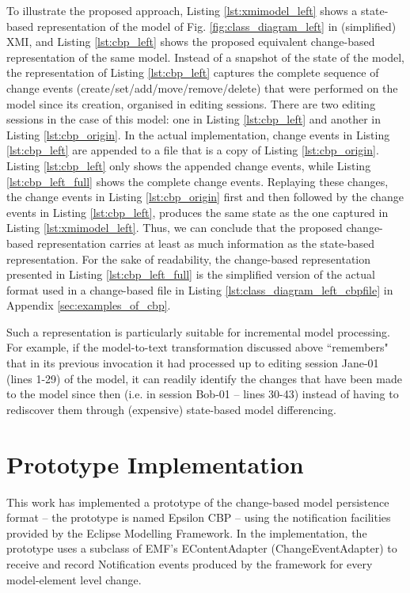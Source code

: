 To illustrate the proposed approach, Listing \ref{lst:xmimodel_left} shows a state-based representation of the model of Fig. \ref{fig:class_diagram_left} in (simplified) XMI, and Listing \ref{lst:cbp_left} shows the proposed equivalent change-based representation of the same model. Instead of a snapshot of the state of the model, the representation of Listing \ref{lst:cbp_left} captures the complete sequence of change events (create/set/add/move/remove/delete) that were performed on the model since its creation, organised in editing sessions. There are two editing sessions in the case of this model: one in Listing \ref{lst:cbp_left} and another in Listing \ref{lst:cbp_origin}. In the actual implementation, change events in Listing \ref{lst:cbp_left} are appended to a file that is a copy of Listing \ref{lst:cbp_origin}. Listing \ref{lst:cbp_left} only shows the appended change events, while Listing \ref{lst:cbp_left_full} shows the complete change events. Replaying these changes, the change events in Listing \ref{lst:cbp_origin} first and then followed by the change events in Listing \ref{lst:cbp_left}, produces the same state as the one captured in Listing \ref{lst:xmimodel_left}. Thus, we can conclude that the proposed change-based representation carries at least as much information as the state-based representation. For the sake of readability, the change-based representation presented in Listing \ref{lst:cbp_left_full} is the simplified version of the actual format used in a  change-based file in Listing \ref{lst:class_diagram_left_cbpfile} in Appendix \ref{sec:examples_of_cbp}. 

Such a representation is particularly suitable for incremental model processing. For example, if the model-to-text transformation discussed above ``remembers" that in its previous invocation it had processed up to editing session \textsf{Jane-01} (lines 1-29) of the model, it can readily identify the changes that have been made to the model since then (i.e. in session \textsf{Bob-01} -- lines 30-43) instead of having to rediscover them through (expensive) state-based model differencing.

\section{Prototype Implementation}
\label{sec:prototype_implementation}
This work has implemented a prototype \cite{epsilonlabs2019emfcbp} of the change-based model persistence format -- the prototype is named Epsilon CBP -- using the notification facilities provided by the Eclipse Modelling Framework. In the implementation, the prototype uses a subclass of EMF's \textsf{EContentAdapter} (\textsf{ChangeEventAdapter}) to receive and record \textsf{Notification} events produced by the framework for every model-element level change.

